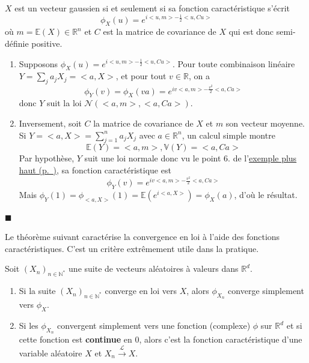 \begin{theoreme}\label{IV-fct_carac_gauss}

\(X\) est un vecteur gaussien si et seulement si sa fonction
caractéristique s'écrit \[\phi_X(u) = e^{i< u,m> - \frac{1}{2}< u,Cu>}\]
où \(m = \mathbb{E}(X) \in \mathbb{R}^n\) et \(C\) est la matrice de
covariance de \(X\) qui est donc semi-définie positive.
\end{theoreme}

\begin{preuve}
\begin{enumerate}
\def\labelenumi{\arabic{enumi}.}
\tightlist
\item
  Supposons \(\phi_X(u) = e^{i< u,m> - \frac{1}{2}< u,Cu>}\). Pour toute
  combinaison linéaire \(Y = \sum_j a_j X_j = < a, X >\), et pour tout
  \(v \in \mathbb{R}\), on a
  \[ \phi_Y(v) = \phi_X(va) = e^{iv< a ,m> - \frac{v^2}{2}< a,Ca>}\]
  donc \(Y\) suit la loi \(\mathcal{N}(< a, m>, < a, Ca>)\).
\item
  Inversement, soit \(C\) la matrice de covariance de \(X\) et \(m\) son
  vecteur moyenne. Si \(Y = < a, X > = \sum_{j=1}^n a_j X_j\) avec
  \(a\in\mathbb{R}^n\), un calcul simple montre
  \[ \mathbb{E}(Y) = < a, m >, \mathbb{V}(Y) = < a, Ca> \] Par
  hypothèse, \(Y\) suit une loi normale donc vu le point 6. de
  l'\protect\hyperref[IV-ex]{exemple plus haut (p.~\pageref*{IV-ex})},
  sa fonction caractéristique est
  \[ \phi_Y(v) = e^{iv< a ,m> - \frac{v^2}{2}< a,Ca>} \] Mais
  \(\phi_Y(1) = \phi_{< a,X>} (1) = \mathbb{E}(e^{i < a, X>}) = \phi_X(a)\),
  d'où le résultat.
\end{enumerate}

\hfill$\blacksquare$
\end{preuve}

Le théorème suivant caractérise la convergence en loi à l'aide des
fonctions caractéristiques. C'est un critère extrêmement utile dans la
pratique.

\begin{theoreme}[{de Lévy}]\label{IV-levytheorem}

Soit \((X_n)_{n \in \mathbb{N}^\ast}\) une suite de vecteurs aléatoires
à valeurs dans \(\mathbb{R}^d\).

\begin{enumerate}
\def\labelenumi{\arabic{enumi}.}
\item
  Si la suite \((X_n)_{n \in \mathbb{N}^\ast}\) converge en loi vers
  \(X\), alors \(\phi_{X_n}\) converge simplement vers \(\phi_X\).
\item
  Si les \(\phi_{X_n}\) convergent simplement vers une fonction
  (complexe) \(\phi\) sur \(\mathbb{R}^d\) et si cette fonction est
  \textbf{continue} en 0, alors c'est la fonction caractéristique d'une
  variable aléatoire \(X\) et \(X_n \xrightarrow{\mathcal{L}} X\).
\end{enumerate}
\end{theoreme}

